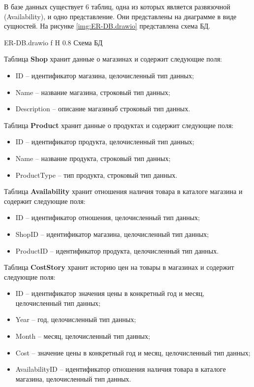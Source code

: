 \documentclass{bmstu}
\begin{document}
В базе данных существует 6 таблиц, одна из которых является развязочной (Availability), и одно представление. Они представлены на диаграмме в виде сущностей. На рисунке \ref{img:ER-DB.drawio} представлена схема БД.

	{ER-DB.drawio}
	{f}
	{H}
	{0.8\textwidth}
	{Схема БД}

Таблица \textbf{Shop} хранит данные о магазинах и содержит следующие поля:
\begin{itemize}
	\item ID -- идентификатор магазина, целочисленный тип данных;
	\item Name -- название магазина, строковый тип данных;
	\item Description -- описание магазинаб строковый тип данных.
\end{itemize}


Таблица \textbf{Product} хранит данные о продуктах и содержит следующие поля:
\begin{itemize}
	\item ID -- идентификатор продукта, целочисленный тип данных;
	\item Name -- название продукта, строковый тип данных;
	\item ProductType -- тип продукта, строковый тип данных.
\end{itemize}


Таблица \textbf{Availability} хранит отношения наличия товара в каталоге магазина и содержит следующие поля:
\begin{itemize}
	\item ID -- идентификатор отношения, целочисленный тип данных;
	\item ShopID -- идентификатор магазина, целочисленный тип данных;
	\item ProductID -- идентификатор продукта, целочисленный тип данных.
\end{itemize}


Таблица \textbf{CostStory} хранит историю цен на товары в магазинах и содержит следующие поля:
\begin{itemize}
	\item ID -- идентификатор значения цены в конкретный год и месяц, целочисленный тип данных;
	\item Year -- год, целочисленный тип данных;
	\item Month -- месяц, целочисленный тип данных;
	\item Cost -- значение цены в конкретный год и месяц, целочисленный тип данных;
	\item AvailabilityID -- идентификатор отношения наличия товара в каталоге магазина, целочисленный тип данных.
\end{itemize}
\end{document}

